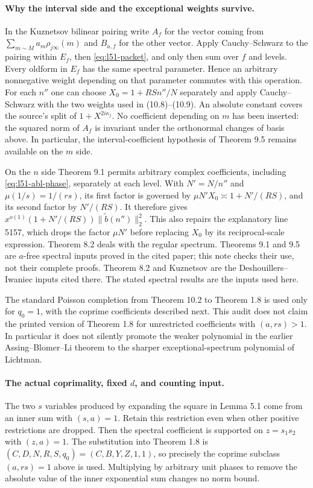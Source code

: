 \paragraph{Why the interval side and the exceptional weights survive.}
In the Kuznetsov bilinear pairing write $A_f$ for the vector coming from
$\sum_{m\sim M}a_m\rho_{j\infty}(m)$ and $B_{a,f}$ for the other vector.
Apply Cauchy--Schwarz to the pairing within $E_f$, then
\eqref{eq:l51-packet}, and only then sum over $f$ and levels.  Every
oldform in $E_f$ has the same spectral parameter.  Hence an arbitrary
nonnegative weight depending on that parameter commutes with this
operation.  For each $n''$ one can choose
$X_0=1+RSn''/N$ separately and apply Cauchy--Schwarz with the two weights
used in (10.8)--(10.9).  An absolute constant covers the source's split
of $1+X^{2i\kappa_j}$.  No coefficient depending on $m$ has been inserted:
the squared norm of $A_f$ is invariant under the orthonormal changes of
basis above.  In particular, the interval-coefficient hypothesis of
Theorem 9.5 remains available on the $m$ side.

On the $n$ side Theorem 9.1 permits arbitrary complex coefficients,
including \eqref{eq:l51-abl-phase}, separately at each level.
With $N'=N/n''$ and $\mu(1/s)=1/(rs)$, its first factor is governed by
$\mu N'X_0\asymp1+N'/(RS)$, and its second factor by
$N'/(RS)$.  It therefore gives
$x^{o(1)}(1+N'/(RS))\|\widetilde b(n'')\|_2^2$.
This also repairs the explanatory line 5157, which drops the factor
$\mu N'$ before replacing $X_0$ by its reciprocal-scale expression.
Theorem 8.2 deals with the regular spectrum.  Theorems 9.1 and 9.5 are
$a$-free spectral inputs proved in the cited paper; this note checks
their use, not their complete proofs.  Theorem 8.2 and Kuznetsov are
the Deshouillers--Iwaniec inputs cited there.  The stated spectral results
are the inputs used here.

The standard Poisson completion from Theorem 10.2 to Theorem 1.8 is used
only for $q_0=1$, with the coprime coefficients described next.  This
audit does not claim the printed version of Theorem 1.8 for unrestricted
coefficients with $(a,rs)>1$.  In particular it does not silently promote
the weaker polynomial in the earlier Assing--Blomer--Li theorem to the
sharper exceptional-spectrum polynomial of Lichtman.

\paragraph{The actual coprimality, fixed $d$, and counting input.}
The two $s$ variables produced by expanding the square in Lemma 5.1
come from an inner sum with $(s,a)=1$.  Retain this restriction even
when other positive restrictions are dropped.  Then the spectral
coefficient is supported on $z=s_1s_2$ with $(z,a)=1$.
The substitution into Theorem 1.8 is
$(C,D,N,R,S,q_0)=(C,B,Y,Z,1,1)$, so precisely the coprime subclass
$(a,rs)=1$ above is used.  Multiplying by arbitrary unit phases to remove
the absolute value of the inner exponential sum changes no norm bound.


